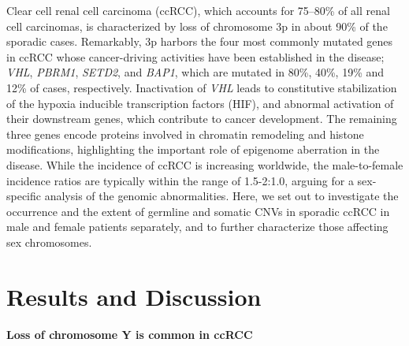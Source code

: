 Clear cell renal cell carcinoma (ccRCC), which accounts for 75--80\% of all renal cell carcinomas, is characterized by loss of chromosome 3p in about 90\% of the sporadic cases\cite{Frew2015}.
Remarkably, 3p harbors the four most commonly mutated genes in ccRCC whose cancer-driving activities have been established in the disease; {\it VHL}\cite{Latif1993}, {\it PBRM1}\cite{Benusiglio2015}, {\it SETD2}\cite{Carvalho2014}, and {\it BAP1}\cite{Popova2013}, which are mutated in 80\%, 40\%, 19\% and 12\% of cases, respectively\cite{Dalgliesh2010,Varela2011,Creighton2013}.
Inactivation of {\it VHL} leads to constitutive stabilization of the hypoxia inducible transcription factors (HIF), and abnormal activation of their downstream genes, which contribute to cancer development\cite{Harris2002}.
The remaining three genes encode proteins involved in chromatin remodeling and histone modifications, highlighting the important role of epigenome aberration in the disease\cite{Frew2015}.
While the incidence of ccRCC is increasing worldwide, the male-to-female incidence ratios are typically within the range of 1.5-2:1.0\cite{Capitanio2016}, arguing for a sex-specific analysis of the genomic abnormalities.
Here, we set out to investigate the occurrence and the extent of germline and somatic CNVs in sporadic ccRCC in male and female patients separately, and to further characterize those affecting sex chromosomes.

\section{Results and Discussion}

\paragraph{Loss of chromosome Y is common in ccRCC}

